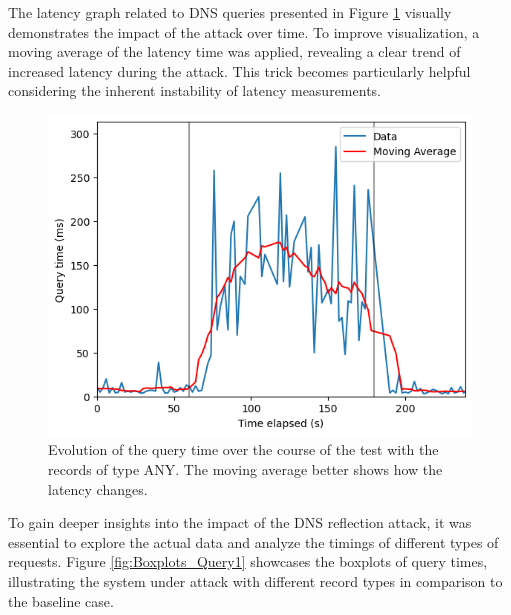 The latency graph related to DNS queries presented in Figure \ref{fig:Query_MA_ANY1} visually demonstrates the impact of the attack over time. To improve visualization, a moving average of the latency time was applied, revealing a clear trend of increased latency during the attack. This trick becomes particularly helpful considering the inherent instability of latency measurements.
\begin{figure}[H]
    \centering
    \includegraphics[width=\columnwidth]{Sections/Images/Query_MA_ANY.png}
    \caption{Evolution of the query time over the course of the test with the records of type ANY. The moving average better shows how the latency changes.}
    \label{fig:Query_MA_ANY1}
\end{figure}
\noindent To gain deeper insights into the impact of the DNS reflection attack, it was essential to explore the actual data and analyze the timings of different types of requests. Figure \ref{fig:Boxplots_Query1} showcases the boxplots of query times, illustrating the system under attack with different record types in comparison to the baseline case. \\
